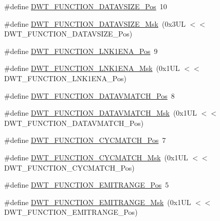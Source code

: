 \begin{DoxyCompactItemize}
\item 
\#define \hyperlink{group___c_m_s_i_s___d_w_t_ga0517a186d4d448aa6416440f40fe7a4d}{D\+W\+T\+\_\+\+F\+U\+N\+C\+T\+I\+O\+N\+\_\+\+D\+A\+T\+A\+V\+S\+I\+Z\+E\+\_\+\+Pos}~10
\item 
\#define \hyperlink{group___c_m_s_i_s___d_w_t_gaab42cbc1e6084c44d5de70971613ea76}{D\+W\+T\+\_\+\+F\+U\+N\+C\+T\+I\+O\+N\+\_\+\+D\+A\+T\+A\+V\+S\+I\+Z\+E\+\_\+\+Msk}~(0x3\+U\+L $<$$<$ D\+W\+T\+\_\+\+F\+U\+N\+C\+T\+I\+O\+N\+\_\+\+D\+A\+T\+A\+V\+S\+I\+Z\+E\+\_\+\+Pos)
\item 
\#define \hyperlink{group___c_m_s_i_s___d_w_t_ga89d7c48858b4d4de96cdadfac91856a1}{D\+W\+T\+\_\+\+F\+U\+N\+C\+T\+I\+O\+N\+\_\+\+L\+N\+K1\+E\+N\+A\+\_\+\+Pos}~9
\item 
\#define \hyperlink{group___c_m_s_i_s___d_w_t_ga64bd419260c3337cacf93607d1ad27ac}{D\+W\+T\+\_\+\+F\+U\+N\+C\+T\+I\+O\+N\+\_\+\+L\+N\+K1\+E\+N\+A\+\_\+\+Msk}~(0x1\+U\+L $<$$<$ D\+W\+T\+\_\+\+F\+U\+N\+C\+T\+I\+O\+N\+\_\+\+L\+N\+K1\+E\+N\+A\+\_\+\+Pos)
\item 
\#define \hyperlink{group___c_m_s_i_s___d_w_t_ga106f3672cd4be7c7c846e20497ebe5a6}{D\+W\+T\+\_\+\+F\+U\+N\+C\+T\+I\+O\+N\+\_\+\+D\+A\+T\+A\+V\+M\+A\+T\+C\+H\+\_\+\+Pos}~8
\item 
\#define \hyperlink{group___c_m_s_i_s___d_w_t_ga32af1f1c0fcd2d8d9afd1ad79cd9970e}{D\+W\+T\+\_\+\+F\+U\+N\+C\+T\+I\+O\+N\+\_\+\+D\+A\+T\+A\+V\+M\+A\+T\+C\+H\+\_\+\+Msk}~(0x1\+U\+L $<$$<$ D\+W\+T\+\_\+\+F\+U\+N\+C\+T\+I\+O\+N\+\_\+\+D\+A\+T\+A\+V\+M\+A\+T\+C\+H\+\_\+\+Pos)
\item 
\#define \hyperlink{group___c_m_s_i_s___d_w_t_ga4b65d79ca37ae8010b4a726312413efd}{D\+W\+T\+\_\+\+F\+U\+N\+C\+T\+I\+O\+N\+\_\+\+C\+Y\+C\+M\+A\+T\+C\+H\+\_\+\+Pos}~7
\item 
\#define \hyperlink{group___c_m_s_i_s___d_w_t_ga8e2ed09bdd33a8f7f7ce0444f5f3bb25}{D\+W\+T\+\_\+\+F\+U\+N\+C\+T\+I\+O\+N\+\_\+\+C\+Y\+C\+M\+A\+T\+C\+H\+\_\+\+Msk}~(0x1\+U\+L $<$$<$ D\+W\+T\+\_\+\+F\+U\+N\+C\+T\+I\+O\+N\+\_\+\+C\+Y\+C\+M\+A\+T\+C\+H\+\_\+\+Pos)
\item 
\#define \hyperlink{group___c_m_s_i_s___d_w_t_ga41d5b332216baa8d29561260a1b85659}{D\+W\+T\+\_\+\+F\+U\+N\+C\+T\+I\+O\+N\+\_\+\+E\+M\+I\+T\+R\+A\+N\+G\+E\+\_\+\+Pos}~5
\item 
\#define \hyperlink{group___c_m_s_i_s___d_w_t_gad46dd5aba29f2e28d4d3f50b1d291f41}{D\+W\+T\+\_\+\+F\+U\+N\+C\+T\+I\+O\+N\+\_\+\+E\+M\+I\+T\+R\+A\+N\+G\+E\+\_\+\+Msk}~(0x1\+U\+L $<$$<$ D\+W\+T\+\_\+\+F\+U\+N\+C\+T\+I\+O\+N\+\_\+\+E\+M\+I\+T\+R\+A\+N\+G\+E\+\_\+\+Pos)
$$
\end{DoxyCompactItemize}
